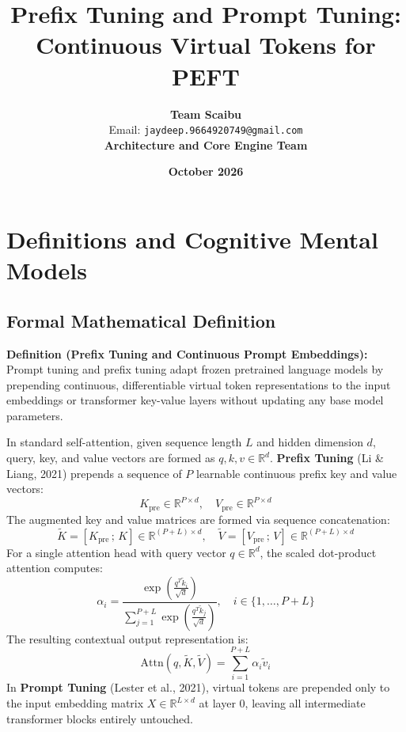 \documentclass[11pt,a4paper]{article}
\title{\textbf{Prefix Tuning and Prompt Tuning: Continuous Virtual Tokens for PEFT}}
\author{\textbf{Team Scaibu} \\ \small Email: \texttt{jaydeep.9664920749@gmail.com} \\ \small \textbf{Architecture and Core Engine Team}}
\date{\textbf{October 2026}}
\theoremstyle{definition}
\begin{document}
\maketitle

\section{Definitions and Cognitive Mental Models}

\subsection{Formal Mathematical Definition}
\textbf{Definition (Prefix Tuning and Continuous Prompt Embeddings):}
Prompt tuning and prefix tuning adapt frozen pretrained language models by prepending continuous, differentiable virtual token representations to the input embeddings or transformer key-value layers without updating any base model parameters.

In standard self-attention, given sequence length $L$ and hidden dimension $d$, query, key, and value vectors are formed as $q, k, v \in \mathbb{R}^d$. \textbf{Prefix Tuning} (Li \& Liang, 2021) prepends a sequence of $P$ learnable continuous prefix key and value vectors:
{\boldmath
\begin{equation}
K_{\text{pre}} \in \mathbb{R}^{P \times d}, \quad V_{\text{pre}} \in \mathbb{R}^{P \times d}
\end{equation}
}
The augmented key and value matrices are formed via sequence concatenation:
{\boldmath
\begin{equation}
\tilde{K} = [K_{\text{pre}} \, ; \, K] \in \mathbb{R}^{(P + L) \times d}, \quad \tilde{V} = [V_{\text{pre}} \, ; \, V] \in \mathbb{R}^{(P + L) \times d}
\end{equation}
}
For a single attention head with query vector $q \in \mathbb{R}^d$, the scaled dot-product attention computes:
{\boldmath
\begin{equation}
\alpha_i = \frac{\exp\left( \frac{q^T \tilde{k}_i}{\sqrt{d}} \right)}{\sum_{j=1}^{P+L} \exp\left( \frac{q^T \tilde{k}_j}{\sqrt{d}} \right)}, \quad i \in \{1, \dots, P+L\}
\end{equation}
}
The resulting contextual output representation is:
{\boldmath
\begin{equation}
\text{Attn}(q, \tilde{K}, \tilde{V}) = \sum_{i=1}^{P+L} \alpha_i \tilde{v}_i
\end{equation}
}
In \textbf{Prompt Tuning} (Lester et al., 2021), virtual tokens are prepended only to the input embedding matrix $X \in \mathbb{R}^{L \times d}$ at layer 0, leaving all intermediate transformer blocks entirely untouched.
\end{document}
